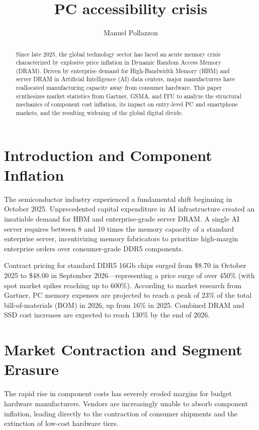 \documentclass[11pt,a4paper]{article}
\title{\textbf{PC accessibility crisis}}
\author{Manuel Pollazzon}
\date{}
\begin{document}
\maketitle

\begin{abstract}
Since late 2025, the global technology sector has faced an acute memory crisis
characterized by explosive price inflation in Dynamic Random Access Memory
(DRAM). Driven by enterprise demand for High-Bandwidth Memory (HBM) and server
DRAM in Artificial Intelligence (AI) data centers, major manufacturers have
reallocated manufacturing capacity away from consumer hardware. This paper
synthesizes market statistics from Gartner, GSMA, and ITU to analyze the
structural mechanics of component cost inflation, its impact on entry-level PC
and smartphone markets, and the resulting widening of the global digital
divide.
\end{abstract}

\section{Introduction and Component Inflation}
The semiconductor industry experienced a fundamental shift beginning in
October 2025. Unprecedented capital expenditure in AI infrastructure created an
insatiable demand for HBM and enterprise-grade server DRAM. A single AI server
requires between 8 and 10 times the memory capacity of a standard enterprise
server, incentivizing memory fabricators to prioritize high-margin enterprise
orders over consumer-grade DDR5 components.

Contract pricing for standard DDR5 16Gb chips surged from \$8.70 in October
2025 to \$48.00 in September 2026---representing a price surge of over 450\%
(with spot market spikes reaching up to 600\%). According to market research
from Gartner, PC memory expenses are projected to reach a peak of 23\% of the
total bill-of-materials (BOM) in 2026, up from 16\% in 2025. Combined DRAM and
SSD cost increases are expected to reach 130\% by the end of 2026.

\section{Market Contraction and Segment Erasure}
The rapid rise in component costs has severely eroded margins for budget
hardware manufacturers. Vendors are increasingly unable to absorb component
inflation, leading directly to the contraction of consumer shipments and the
extinction of low-cost hardware tiers.
\end{document}
